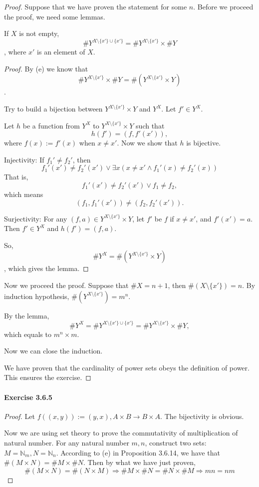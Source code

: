 \begin{proof}
Suppose that we have proven the statement for some $n$. Before we proceed the proof, we need some lemmas.
\begin{lem}
If $X$ is not empty, 
\[
\#Y^{X\setminus\{x'\}\cup\{x'\}} = \#Y^{X\setminus\{x'\}} \times \#Y
\], 
where $x'$ is an element of $X$.
\end{lem}
\begin{proof}
By (e) we know that 
\[
\#Y^{X\setminus\{x'\}} \times \#Y = \#(Y^{X\setminus\{x'\}} \times Y)
\].

Try to build a bijection between $Y^{X\setminus\{x'\}} \times Y$ and $Y^X$. Let $f' \in Y^X$.

Let $h$ be a function from $Y^X$ to $Y^{X\setminus\{x'\}} \times Y$ such that
\[
h(f') = (f,f'(x')), 
\]
where $f(x):=f'(x)$ when $x \neq x'$. Now we show that $h$ is bijective.

Injectivity: 
If ${f_1}' \neq {f_2}'$, then 
\[
{f_1}'(x') \neq {f_2}'(x') \vee \exists x(x \neq x' \wedge {f_1}'(x) \neq {f_2}'(x))
\]
That is, 
\[
{f_1}'(x') \neq {f_2}'(x') \vee f_1 \neq f_2,
\]
which means 
\[
(f_1,{f_1}'(x')) \neq (f_2,{f_2}'(x')).
\]

Surjectivity:
For any $(f,a) \in Y^{X\setminus\{x'\}} \times Y$, let $f'$ be $f$ if $x\neq x'$, and $f'(x') = a$. Then 
$f' \in Y^X$ and $h(f') = (f,a)$.

So, 
\[
\#Y^X = \#(Y^{X\setminus\{x'\}} \times Y)
\], which gives the lemma.
\end{proof}

Now we proceed the proof. Suppose that $\#X = n+1$, then $\#(X \setminus\{x'\}) = n$. By induction 
hypothesis, $\#(Y^{X \setminus\{x'\}}) = m^n$. 

By the lemma, 
\[
\#Y^X = \#Y^{X\setminus\{x'\}\cup\{x'\}} = \#Y^{X\setminus\{x'\}} \times \#Y,
\]
which equals to $m^n \times m$.

Now we can close the induction.

We have proven that the cardinality of power sets obeys the definition of power. This ensures the 
exercise.
\end{proof}

\paragraph{Exercise 3.6.5} \label{exercise3.6.5}
\begin{proof}
Let $f((x,y)):= (y,x), A\times B \rightarrow B \times A$. The bijectivity is obvious. 

Now we are using set theory to prove the commutativity of multiplication of natural number. For any 
natural number $m,n$, construct two sets: $M = \mathbb{N}_{m}, N = \mathbb{N}_{n}$. According to (e) in 
Proposition 3.6.14, we have that $\#(M \times N) = \#M \times \#N$. Then by what we have just proven, 
\[
\#(M \times N) = \#(N \times M) \Longrightarrow \#M \times \#N = \#N \times \#M \Longrightarrow mn = nm
\]
\end{proof}

